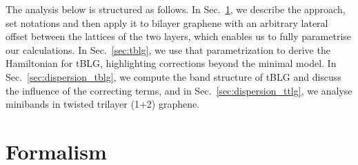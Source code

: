 \documentclass[showpacs,aps,prb,reprint,twocolumn]{revtex4-1}
\begin{document}
The analysis below is structured as follows. In Sec.~\ref{sec:form}, we describe the approach, set notations and then apply it to bilayer graphene with an arbitrary lateral offset between the lattices of the two layers, which enables us to fully parametrise our calculations. In Sec.~\ref{sec:tblg}, we use that parametrization to derive the Hamiltonian for tBLG, highlighting corrections beyond the minimal model. In Sec.~\ref{sec:dispersion_tblg}, we compute the band structure of tBLG and discuss the influence of the correcting terms, and in Sec.~\ref{sec:dispersion_ttlg}, we analyse minibands in twisted trilayer (1+2) graphene.

\section{Formalism}
\label{sec:form}
\end{document}
